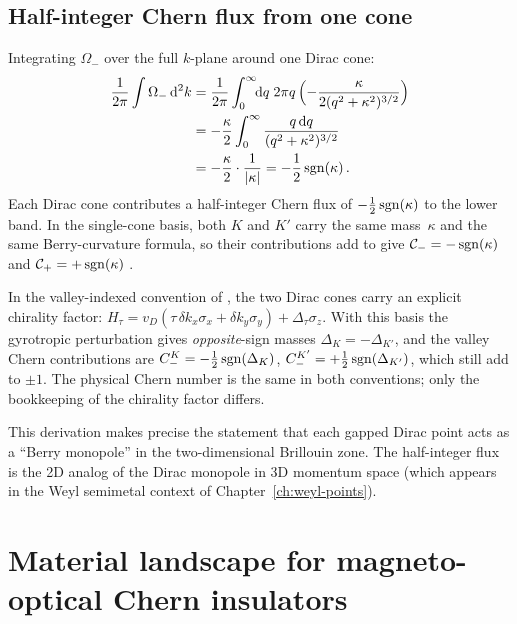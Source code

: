 \subsection{Half-integer Chern flux from one cone}
\label{sec:ch7-half-chern}

Integrating $\Omega_-$ over the full $k$-plane around one Dirac cone:
\begin{align}
  \frac{1}{2\pi}\int\Omega_-\,\mathrm{d}^2 k
  &= \frac{1}{2\pi}\int_0^\infty\!\!\mathrm{d} q\;
  2\pi q\,\Bigl(-\frac{\kappa}{2(q^2+\kappa^2)^{3/2}}\Bigr)
  \notag\\
  &= -\frac{\kappa}{2}\int_0^\infty
  \frac{q\,\mathrm{d} q}{(q^2+\kappa^2)^{3/2}}
  \notag\\
  &= -\frac{\kappa}{2}\cdot
  \frac{1}{|\kappa|}
  = -\frac{1}{2}\operatorname{sgn}(\kappa)\,.
  \label{eq:ch7-half-chern-radial}
\end{align}
Each Dirac cone contributes a half-integer Chern flux of
$-\frac{1}{2}\operatorname{sgn}(\kappa)$ to the lower band.  In the single-cone
basis, both $K$ and $K'$ carry the same mass~$\kappa$ and the same
Berry-curvature formula, so their contributions add to give
$\mathcal{C}_-=-\operatorname{sgn}(\kappa)$ and $\mathcal{C}_+=+\operatorname{sgn}(\kappa)$
\cite{haldane2008possible,thouless1982quantized}.

\begin{remark}
In the valley-indexed convention of , the two
Dirac cones carry an explicit chirality factor:
$H_\tau=v_D(\tau\,\delta k_x\sigma_x+\delta k_y\sigma_y)
+\Delta_\tau\sigma_z$.
With this basis the gyrotropic perturbation gives
\emph{opposite}-sign masses $\Delta_K=-\Delta_{K'}$, and the valley
Chern contributions are $C_-^K=-\tfrac{1}{2}\operatorname{sgn}(\Delta_K)$,
$C_-^{K'}=+\tfrac{1}{2}\operatorname{sgn}(\Delta_{K'})$, which still add to
$\pm 1$.  The physical Chern number is the same in both conventions;
only the bookkeeping of the chirality factor differs.
\end{remark}

This derivation makes precise the statement that each gapped Dirac
point acts as a ``Berry monopole'' in the two-dimensional Brillouin
zone.  The half-integer flux is the 2D analog of the Dirac monopole
in 3D momentum space (which appears in the Weyl semimetal context of
Chapter~\ref{ch:weyl-points}).

\section{Material landscape for magneto-optical Chern insulators}
\label{sec:ch7-materials-landscape}

